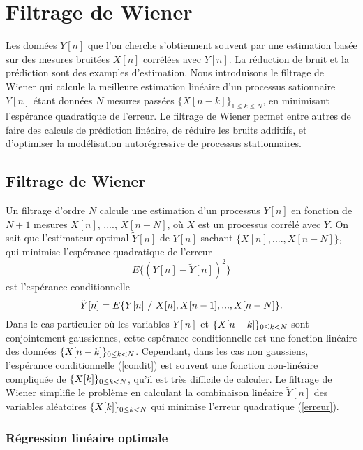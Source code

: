 \chapter{Filtrage de Wiener}
\label{wiener-chap}

Les donn\'ees $Y[n]$ que l'on cherche
s'obtiennent souvent par une estimation bas\'ee sur 
des mesures bruit\'ees $X[n]$
corr\'el\'ees avec $Y[n]$.
La r\'eduction de bruit et la 
pr\'ediction sont des examples d'estimation.
Nous introduisons le 
filtrage de Wiener qui 
calcule la meilleure estimation lin\'eaire
d'un processus sationnaire 
$Y[n]$ \'etant donn\'ees $N$ mesures pass\'ees 
$\{X[n-k]\}_{1 \leq k \leq N}$, en minimisant l'esp\'erance
quadratique de l'erreur.
Le filtrage de Wiener permet entre autres de faire des calculs de
pr\'ediction lin\'eaire, de r\'eduire les bruits additifs, et
d'optimiser la mod\'elisation autor\'egressive
de processus stationnaires.


\section{Filtrage de Wiener}
\label{wiener}

Un filtrage d'ordre $N$ calcule une estimation
d'un processus $Y[n]$ en fonction 
de $N+1$ mesures $X[n]$, ...., $X[n-N]$, o\`u $X$ est un processus
corr\'el\'e avec $Y$.
On sait \cite{neveu} que l'estimateur optimal $\tilde Y[n]$ 
de $Y[n]$ sachant $\{X[n], ...., X[n-N]\}$, qui minimise
l'esp\'erance quadratique de l'erreur
\begin{equation}
\label{erreur}
E \{ (Y[n] - \tilde Y[n])^2 \} 
\end{equation}
est l'esp\'erance conditionnelle
\begin{equation}
\label{condit}
\tilde Y [n] = E \{Y[n]~{/}~ X[n], X[n-1],..., X[n-N]\} .
\end{equation}
Dans le cas particulier o\`u
les variables $Y[n]$ et $\{ X[n-k]\}_{ 0 \leq k < N}$ sont
conjointement gaussiennes, cette esp\'erance conditionnelle
est une fonction lin\'eaire des donn\'ees $\{ X[n-k]\}_{ 0 \leq k < N}$.
Cependant, dans les cas non gaussiens,
l'esp\'erance conditionnelle (\ref{condit}) est souvent
une fonction
non-lin\'eaire compliqu\'ee de $\{X[k]\}_{ 0 \leq k < N}$,
qu'il est tr\`es difficile de calculer. 
Le filtrage de Wiener
simplifie le probl\`eme en calculant la combinaison lin\'eaire
$\tilde Y[n]$ 
des variables al\'eatoires $\{X[k]\}_{ 0 \leq k < N}$ 
qui minimise l'erreur quadratique (\ref{erreur}).

\subsection{R\'egression lin\'eaire optimale}

